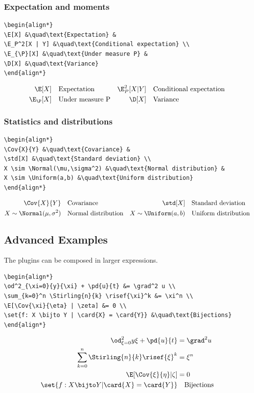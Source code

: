 \documentclass{article}
\begin{document}
\subsubsection*{Expectation and moments}
\begin{verbatim}
\begin{align*}
\E[X] &\quad\text{Expectation} &
\E_P^2[X | Y] &\quad\text{Conditional expectation} \\
\E_{\P}[X] &\quad\text{Under measure P} &
\D[X] &\quad\text{Variance}
\end{align*}
\end{verbatim}
\begin{align*}
\E[X] &\quad\text{Expectation} &
\E_P^2[X | Y] &\quad\text{Conditional expectation} \\
\E_{\P}[X] &\quad\text{Under measure P} &
\D[X] &\quad\text{Variance}
\end{align*}

\subsubsection*{Statistics and distributions}
\begin{verbatim}
\begin{align*}
\Cov{X}{Y} &\quad\text{Covariance} &
\std[X] &\quad\text{Standard deviation} \\
X \sim \Normal(\mu,\sigma^2) &\quad\text{Normal distribution} &
X \sim \Uniform(a,b) &\quad\text{Uniform distribution}
\end{align*}
\end{verbatim}
\begin{align*}
\Cov{X}{Y} &\quad\text{Covariance} &
\std[X] &\quad\text{Standard deviation} \\
X \sim \Normal(\mu,\sigma^2) &\quad\text{Normal distribution} &
X \sim \Uniform(a,b) &\quad\text{Uniform distribution}
\end{align*}

\subsection{Advanced Examples}

The plugins can be composed in larger expressions.

\begin{verbatim}
\begin{align*}
\od^2_{\xi=0}{y}{\xi} + \pd{u}{t} &= \grad^2 u \\
\sum_{k=0}^n \Stirling{n}{k} \risef{\xi}^k &= \xi^n \\
\E[\Cov{\xi}{\eta} | \zeta] &= 0 \\
\set{f: X \bijto Y | \card{X} = \card{Y}} &\quad\text{Bijections}
\end{align*}
\end{verbatim}
\begin{align*}
\od^2_{\xi=0}{y}{\xi} + \pd{u}{t} &= \grad^2 u \\
\sum_{k=0}^n \Stirling{n}{k} \risef{\xi}^k &= \xi^n \\
\E[\Cov{\xi}{\eta} | \zeta] &= 0 \\
\set{f: X \bijto Y | \card{X} = \card{Y}} &\quad\text{Bijections}
\end{align*}
\end{document}
